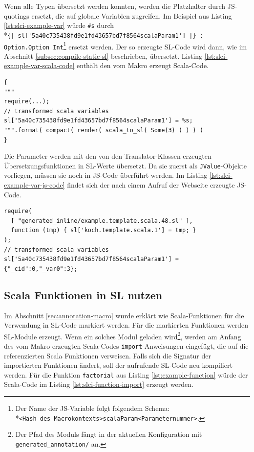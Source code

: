 \documentclass[12pt,bibtotoc]{scrreprt}
\begin{document}
Wenn alle Typen übersetzt werden konnten, werden die Platzhalter durch \ac{JS}-quotings ersetzt, die auf globale Variablen zugreifen. Im Beispiel aus Listing \ref{lst:slci-example-var} würde \lstinline!#s! durch \\*\lstinline!{| sl['5a40c735438fd9e1fd43657bd7f8564scalaParam1'] |} : Option.Option Int!\footnote{Der Name der JS-Variable folgt folgendem Schema: \\*\lstinline!<Hash des Macrokontexts>scalaParam<Parameternummer>!.} ersetzt werden. Der so erzeugte SL-Code wird dann, wie im Abschnitt \ref{subsec:compile-static-sl} beschrieben, übersetzt. 
Listing \ref{lst:slci-example-var-scala-code} enthält den vom Makro erzeugt Scala-Code. 

\begin{lstlisting}[caption={Erzeugter Scala-Code zum Listing \ref{lst:slci-example-var}}, label=lst:slci-example-var-scala-code, float=h]
{ 
"""
require(...);
// transformed scala variables    
sl['5a40c735438fd9e1fd43657bd7f8564scalaParam1'] = %s;
""".format( compact( render( scala_to_sl( Some(3) ) ) ) )
}
\end{lstlisting}

Die Parameter werden mit den von den Translator-Klassen erzeugten Übersetzungsfunktionen in \ac{SL}-Werte übersetzt. Da sie zuerst als \lstinline!JValue!-Objekte vorliegen, müssen sie noch in \ac{JS}-Code überführt werden. Im Listing \ref{lst:slci-example-var-js-code} findet sich der nach einem Aufruf der Webseite erzeugte \ac{JS}-Code.

\begin{lstlisting}[caption={JS-Code zum Listing \ref{lst:slci-example-var}}, label=lst:slci-example-var-js-code, float=h]
require( 
  [ "generated_inline/example.template.scala.48.sl" ],
  function (tmp) { sl['koch.template.scala.1'] = tmp; }
);
// transformed scala variables 
sl['5a40c735438fd9e1fd43657bd7f8564scalaParam1'] = {"_cid":0,"_var0":3};
\end{lstlisting}

\subsection{Scala Funktionen in SL nutzen}
\label{subsec:use-scala-function-in-sl}

Im Abschnitt \ref{sec:annotation-macro} wurde erklärt wie Scala-Funktionen für die Verwendung in \ac{SL}-Code markiert werden. Für die markierten Funktionen werden \ac{SL}-Module erzeugt. Wenn ein solches Modul geladen wird\footnote{Der Pfad des Moduls fängt in der aktuellen Konfiguration mit \lstinline!generated_annotation/! an.}, werden am Anfang des vom Makro erzeugten Scala-Codes \lstinline!import!-Anweisungen eingefügt, die auf die referenzierten Scala Funktionen verweisen. Falls sich die Signatur der importierten Funktionen ändert, soll der aufrufende SL-Code neu kompiliert werden.
Für die Funktion \lstinline!factorial! aus Listing \ref{lst:example-function} würde der Scala-Code im Listing \ref{lst:slci-function-import} erzeugt werden.
\end{document}
